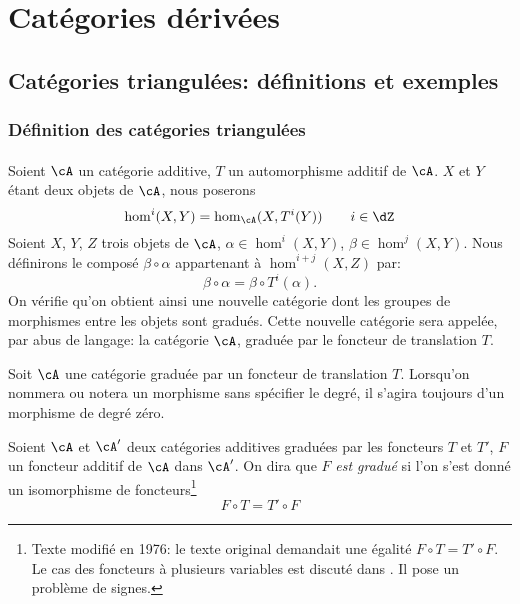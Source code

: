 
\chapter{Cat\'egories dérivées}\label{VIII}










\section{Cat\'egories triangul\'ees: d\'efinitions et exemples}\label{VIII:1}





\subsection{D\'efinition des cat\'egories triangul\'ees}\label{VIII:1-1}


\addtocounter{subsubsection}{-1}
\subsubsection{}\label{VIII:1-1-0}

Soient $\cA$ un cat\'egorie additive, $T$ un automorphisme additif de $\cA$. 
$X$ et $Y$ \'etant deux objets de $\cA$, nous poserons 
\[
  \hom^i(X,Y) = \hom_\cA(X,T^i(Y)) \qquad i\in \dZ 
\]
Soient $X$, $Y$, $Z$ trois objets de $\cA$, $\alpha\in \hom^i(X,Y)$, 
$\beta\in \hom^j(X,Y)$. Nous d\'efinirons le compos\'e $\beta\circ\alpha$ 
appartenant \`a $\hom^{i+j}(X,Z)$ par: 
\[
  \beta\circ \alpha = \beta\circ T^i(\alpha) \text{.}
\]
On v\'erifie qu'on obtient ainsi une nouvelle cat\'egorie dont les groupes de 
morphismes entre les objets sont gradu\'es. Cette nouvelle cat\'egorie sera 
appel\'ee, par abus de langage: la cat\'egorie $\cA$, gradu\'ee par le foncteur 
de translation $T$. 

Soit $\cA$ une cat\'egorie gradu\'ee par un foncteur de translation $T$. 
Lorsqu'on nommera ou notera un morphisme sans sp\'ecifier le degr\'e, il 
s'agira toujours d'un morphisme de degr\'e z\'ero. 

Soient $\cA$ et $\cA'$ deux cat\'egories additives gradu\'ees par les foncteurs
$T$ et $T'$, $F$ un foncteur additif de $\cA$ dans $\cA'$. On dira que $F$ 
\emph{est gradu\'e} si l'on s'est donn\'e un isomorphisme de 
foncteurs\footnote{Texte modifi\'e en 1976: le texte original demandait une 
\'egalit\'e $F\circ T=T'\circ F$. Le cas des foncteurs \`a plusieurs variables 
est discut\'e dans \cite[XVIII 0.2]{sga4}. Il pose un probl\`eme de signes.} 
\[
  F\circ T = T'\circ F 
\]

